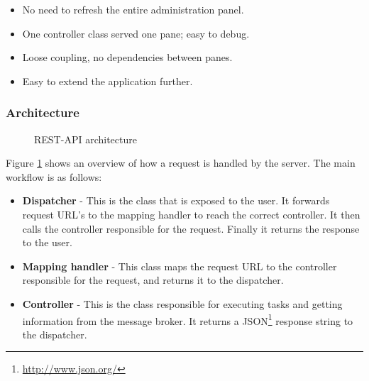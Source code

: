 \begin{itemize}
    \item No need to refresh the entire administration panel.
    \item One controller class served one pane; easy to debug.
    \item Loose coupling, no dependencies between panes.
    \item Easy to extend the application further.
\end{itemize}

\subsubsection{Architecture}

\begin{center}
  \begin{figure}[ht!]
    \caption{REST-API architecture}
    \label{fig:spring}
  \end{figure}
\end{center}

Figure \ref{fig:spring} shows an overview of how a request is handled by the server. The main workflow is as follows:

\clearpage

\begin{itemize}
    \item\textbf{Dispatcher} -  This is the class that is exposed to the user. It forwards request URL's to the mapping handler to reach the correct controller. It then calls the controller responsible for the request. Finally it returns the response to the user. 
    \item\textbf{Mapping handler} - This class maps the request URL to the controller responsible for the request, and returns it to the dispatcher. 
    \item\textbf{Controller} - This is the class responsible for executing tasks and getting information from the message broker. It returns a JSON\footnote{\url{http://www.json.org/}} response string to the dispatcher.  
\end{itemize}

